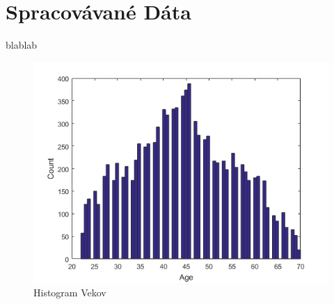 \section{Spracovávané Dáta}

blablab

\begin{figure}[h!]
	\centering
  		\includegraphics[width=1.0\textwidth]{ages.png}
  	\caption{Histogram Vekov}
\end{figure}